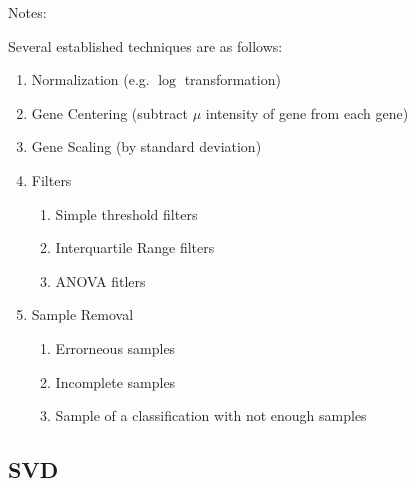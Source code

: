 \documentclass[serif]{beamer}
\begin{document}
	\begin{frame}
		\begin{block}{Notes:}
			
			Several established techniques are as follows:
			
			\begin{enumerate}
				\item
				{
					\color<2->{blockgray}
					{
						Normalization (e.g. $\log$ transformation)
					}
				}
				\item
				{	
					\color<1,3->{blockgray}
					{					
						Gene Centering (subtract $\mu$
						intensity of gene from each gene)
					}
				}
				\item
				{
					\color<1-2,4->{blockgray}
					{
						Gene Scaling (by standard deviation)
					}
				}
				\item
				{
					{
						Filters
					}
					\begin{enumerate}
						\item
						{
							\color<1-3,5>{blockgray}
							{
								Simple threshold filters
							}
						}
						\item 
						{
							\color<1-3,5>{blockgray}
							{
								Interquartile Range filters
							}
						}
						\item
						{
							\color<1-3,5>{blockgray}
							{
								ANOVA fitlers
							}
						}
					\end{enumerate}
				}
				\item 
				{
					{
						Sample Removal
					}
					\begin{enumerate}
						\item
						{
							\color<1-4>{blockgray}
							{
								Errorneous samples
							}
						}
						\item
						{
							\color<1-4>{blockgray}
							{
								Incomplete samples
							}
						}
						\item
						{
							\color<1-4>{blockgray}
							{
								Sample of a classification with not enough samples
							}
						}
					\end{enumerate}
				}
			\end{enumerate}
		\end{block}
		
	\end{frame}

	\subsection{SVD}
\end{document}
